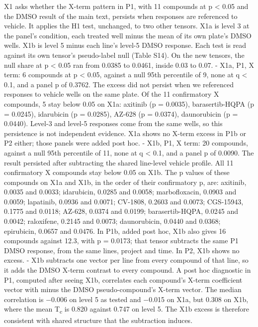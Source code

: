 \documentclass[
  11pt,
  letterpaper,
]{article}
\newcounter{none} %
\begin{document}
X1 asks whether the X-term pattern in P1, with 11 compounds at p
\textless{} 0.05 and the DMSO result of the main text, persists when
responses are referenced to vehicle. It applies the H1 test, unchanged,
to two other tensors. X1a is level 3 at the panel's condition, each
treated well minus the mean of its own plate's DMSO wells. X1b is level
5 minus each line's level-5 DMSO response. Each test is read against its
own tensor's pseudo-label null (Table S14). On the new tensors, the null
share at p \textless{} 0.05 ran from 0.0385 to 0.0461, inside 0.03 to
0.07. - X1a, P1, X term: 6 compounds at p \textless{} 0.05, against a
null 95th percentile of 9, none at q \textless{} 0.1, and a panel p of
0.3762. The excess did not persist when we referenced responses to
vehicle wells on the same plate. Of the 11 confirmatory X compounds, 5
stay below 0.05 on X1a: axitinib (p = 0.0035), barasertib-HQPA (p =
0.0245), idarubicin (p = 0.0285), AZ-628 (p = 0.0374), daunorubicin (p =
0.0440). Level-3 and level-5 responses come from the same wells, so this
persistence is not independent evidence. X1a shows no X-term excess in
P1b or P2 either; those panels were added post hoc. - X1b, P1, X term:
20 compounds, against a null 95th percentile of 11, none at q
\textless{} 0.1, and a panel p of 0.0090. The result persisted after
subtracting the shared line-level vehicle profile. All 11 confirmatory X
compounds stay below 0.05 on X1b. The p values of these compounds on X1a
and X1b, in the order of their confirmatory p, are: axitinib, 0.0035 and
0.0033; idarubicin, 0.0285 and 0.0058; marbofloxacin, 0.0903 and 0.0059;
lapatinib, 0.0936 and 0.0071; CV-1808, 0.2603 and 0.0073; CGS-15943,
0.1775 and 0.0118; AZ-628, 0.0374 and 0.0199; barasertib-HQPA, 0.0245
and 0.0042; raloxifene, 0.2145 and 0.0073; daunorubicin, 0.0440 and
0.0368; epirubicin, 0.0657 and 0.0476. In P1b, added post hoc, X1b also
gives 16 compounds against 12.3, with p = 0.0173; that tensor subtracts
the same P1 DMSO response, from the same lines, project and time. In P2,
X1b shows no excess. - X1b subtracts one vector per line from every
compound of that line, so it adds the DMSO X-term contrast to every
compound. A post hoc diagnostic in P1, computed after seeing X1b,
correlates each compound's X-term coefficient vector with minus the DMSO
pseudo-compound's X-term vector. The median correlation is −0.006 on
level 5 as tested and −0.015 on X1a, but 0.308 on X1b, where the mean
T\textsubscript{c} is 0.820 against 0.747 on level 5. The X1b excess is
therefore consistent with shared structure that the subtraction induces.
\end{document}
